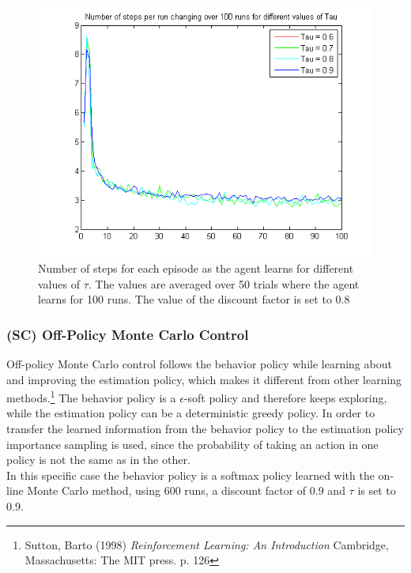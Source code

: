 \documentclass{article}
\begin{document}
\begin{figure}
\centering
\caption{Number of steps for each episode as the agent learns for different values of $\tau$. The values are averaged over 50 trials where the agent learns for 100 runs. The value of the discount factor is set to 0.8}
\label{fig:onLineMonteCarloTau}
\includegraphics[scale=0.8]{averagesInOneFig_online_Tau.png}
\end{figure}



\subsubsection{(SC) Off-Policy Monte Carlo Control}\label{sec:exercise4.2}

Off-policy Monte Carlo control follows the behavior policy while learning about and improving the estimation policy, which makes it different from other learning methods.\footnote{Sutton, Barto (1998) \textit{Reinforcement Learning: An Introduction} Cambridge, Massachusetts: The MIT press. p. 126} The behavior policy is a $\epsilon$-soft policy and therefore keeps exploring, while the estimation policy can be a deterministic greedy policy. In order to transfer the learned information from the behavior policy to the estimation policy importance sampling is used, since the probability of taking an action in one policy is not the same as in the other.\\

In this specific case the behavior policy is a softmax policy learned with the on-line Monte Carlo method, using 600 runs, a discount factor of 0.9 and $\tau$ is set to 0.9.
\end{document}

